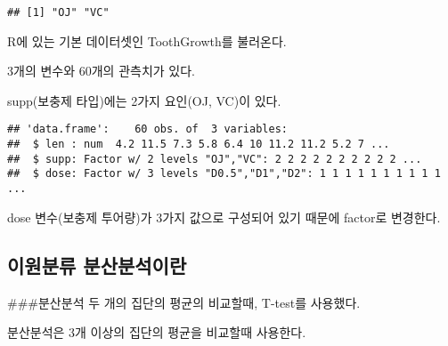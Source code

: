 \documentclass[
]{article}
\newenvironment{Shaded}{\begin{snugshade}}{\end{snugshade}}
\newcommand{\AttributeTok}[1]{\textcolor[rgb]{0.77,0.63,0.00}{#1}}
\newcommand{\DecValTok}[1]{\textcolor[rgb]{0.00,0.00,0.81}{#1}}
\newcommand{\FloatTok}[1]{\textcolor[rgb]{0.00,0.00,0.81}{#1}}
\newcommand{\FunctionTok}[1]{\textcolor[rgb]{0.00,0.00,0.00}{#1}}
\newcommand{\NormalTok}[1]{#1}
\newcommand{\OtherTok}[1]{\textcolor[rgb]{0.56,0.35,0.01}{#1}}
\newcommand{\SpecialCharTok}[1]{\textcolor[rgb]{0.00,0.00,0.00}{#1}}
\newcommand{\StringTok}[1]{\textcolor[rgb]{0.31,0.60,0.02}{#1}}
\begin{document}
\begin{Shaded}
\end{Shaded}

\begin{verbatim}
## [1] "OJ" "VC"
\end{verbatim}

R에 있는 기본 데이터셋인 ToothGrowth를 불러온다.

3개의 변수와 60개의 관측치가 있다.

supp(보충제 타입)에는 2가지 요인(OJ, VC)이 있다.

\begin{Shaded}
\end{Shaded}

\begin{verbatim}
## 'data.frame':    60 obs. of  3 variables:
##  $ len : num  4.2 11.5 7.3 5.8 6.4 10 11.2 11.2 5.2 7 ...
##  $ supp: Factor w/ 2 levels "OJ","VC": 2 2 2 2 2 2 2 2 2 2 ...
##  $ dose: Factor w/ 3 levels "D0.5","D1","D2": 1 1 1 1 1 1 1 1 1 1 ...
\end{verbatim}

dose 변수(보충제 투어량)가 3가지 값으로 구성되어 있기 때문에 factor로 변경한다.

\hypertarget{uxc774uxc6d0uxbd84uxb958-uxbd84uxc0b0uxbd84uxc11duxc774uxb780}{%
\subsection{이원분류 분산분석이란}\label{uxc774uxc6d0uxbd84uxb958-uxbd84uxc0b0uxbd84uxc11duxc774uxb780}}

\#\#\#분산분석
두 개의 집단의 평균의 비교할때, T-test를 사용했다.

분산분석은 3개 이상의 집단의 평균을 비교할때 사용한다.
\end{document}
